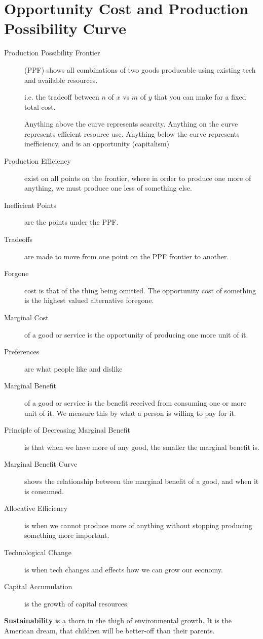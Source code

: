             \section{Opportunity Cost and Production Possibility Curve} %
            \label{sec:opportunity_cost_and_production_possibility_curve}
                \begin{description}
                    \item[Production Possibility Frontier] (PPF) shows all combinations of two goods producable using existing tech and available resources.

                        i.e. the tradeoff between $n$ of $x$ vs $m$ of $y$ that you can make for a fixed total cost.

                        Anything above the curve represents scarcity.
                        Anything on the curve represents efficient resource use.
                        Anything below the curve represents inefficiency, and is an opportunity (capitalism)
                    \item[Production Efficiency] exist on all points on the frontier, where in order to produce one more of anything, we must produce one less of something else.
                    \item[Inefficient Points] are the points under the PPF.
                    \item[Tradeoffs] are made to move from one point on the PPF frontier to another.
                    \item[Forgone] cost is that of the thing being omitted. The opportunity cost of something is the highest valued alternative foregone.
                    \item[Marginal Cost] of a good or service is the opportunity of producing one more unit of it.
                    \item[Preferences] are what people like and dislike
                    \item[Marginal Benefit] of a good or service is the benefit received from consuming one or more unit of it. We measure this by what a person is willing to pay for it.
                    \item[Principle of Decreasing Marginal Benefit] is that when we have more of any good, the smaller the marginal benefit is.
                    \item[Marginal Benefit Curve] shows the relationship between the marginal benefit of a good, and when it is consumed.
                    \item[Allocative Efficiency] is when we cannot produce more of anything without stopping producing something more important.
                    \item[Technological Change] is when tech changes and effects how we can grow our economy.
                    \item[Capital Accumulation] is the growth of capital resources.
                \end{description}
                \textbf{Sustainability} is a thorn in the thigh of environmental growth. It is the American dream, that children will be better-off than their parents.



